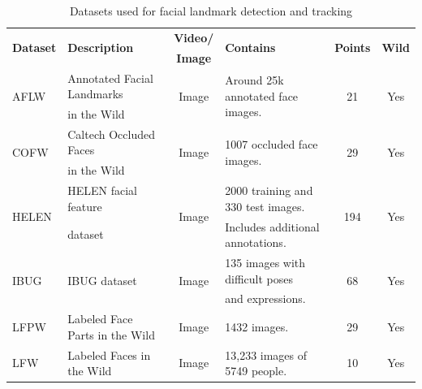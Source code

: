 \documentclass{llncs}
\begin{document}
	\vspace{-8mm}
	\begin{table}[]
		\begin{center}%
			\caption{Datasets used for facial landmark detection and tracking}
			\begin{tabular}{|l|l|c|l|c|c|}
				\hline
				\multirow{2}{*}{\textbf{Dataset}} & \multirow{2}{*}{\textbf{Description}} & \textbf{Video/} & \multirow{2}{*}{\textbf{Contains}} & \multirow{2}{*}{\textbf{Points}} & \multirow{2}{*}{\textbf{Wild}} \\
				& & \textbf{Image} & & & \\
				\hline
				
				\multirow{2}{*}{AFLW\cite{aflw}} & Annotated Facial Landmarks & \multirow{2}{*}{Image} & \multirow{2}{*}{Around 25k annotated face images.} & \multirow{2}{*}{21} & \multirow{2}{*}{Yes} \\
				& in the Wild & & & & \\
				\hline
				
				\multirow{2}{*}{COFW\cite{cofw}} & Caltech Occluded Faces & \multirow{2}{*}{Image} & \multirow{2}{*}{1007 occluded face images.} & \multirow{2}{*}{29} & \multirow{2}{*}{Yes} \\
				& in the Wild & & & & \\
				\hline
				
				\multirow{2}{*}{HELEN\cite{helen}} & HELEN facial feature & \multirow{2}{*}{Image} & 2000 training and 330 test images. & \multirow{2}{*}{194} & \multirow{2}{*}{Yes} \\
				& dataset & & Includes additional annotations. & & \\
				\hline
				
				\multirow{2}{*}{IBUG\cite{ibug}} & \multirow{2}{*}{IBUG dataset} & \multirow{2}{*}{Image} & 135 images with difficult poses & \multirow{2}{*}{68} & \multirow{2}{*}{Yes} \\
				& & & and expressions. & & \\
				\hline
				
				LFPW\cite{lfpw} & Labeled Face Parts in the Wild & Image & 1432 images. & 29 & Yes \\
				\hline
				
				LFW\cite{lfw} & Labeled Faces in the Wild & Image & 13,233 images of 5749 people. & 10 & Yes \\
				\hline
				

\end{tabular}
\end{center}
\end{table}
\end{document}
